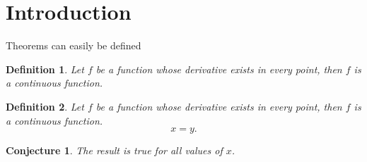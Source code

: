 \documentclass{article}
\newtheorem{definition}{Definition}
\newtheorem{conjecture}{Conjecture}
\begin{document}
\section{Introduction}
Theorems can easily be defined

\begin{definition}
	\label{def:label1}
	Let $f$ be a function whose derivative exists in every point, then $f$ is a continuous function.
\end{definition}
 
\begin{definition} %
	\label{def:label2}
	Let $f$ be a function whose derivative exists in every point, then $f$ is a continuous function.
	\begin{equation}
		\label{eq:def2}
		x = y.
	\end{equation}
\end{definition}

\begin{comment}
	Should not appear in arxiv
\end{comment}




\begin{conjecture}
	\label{conjecture:1}
	The result is true for all values of $x$.
\end{conjecture}
\end{document}
